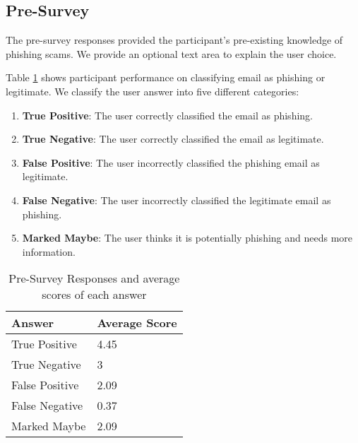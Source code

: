 \subsection{Pre-Survey}
The pre-survey responses provided the participant's pre-existing knowledge of phishing scams. We provide an optional text area to explain the user choice.

Table \ref{tab:pre_survey_responses} shows participant performance on classifying email as phishing or legitimate. We classify the user answer into five different categories:

\begin{enumerate}
    \setlength{\itemsep}{0pt}
    \setlength{\parskip}{0pt}
    \setlength{\topsep}{0pt}
    \item \textbf{True Positive}: The user correctly classified the email as phishing.
    \item \textbf{True Negative}: The user correctly classified the email as legitimate.
    \item \textbf{False Positive}: The user incorrectly classified the phishing email as legitimate.
    \item \textbf{False Negative}: The user incorrectly classified the legitimate email as phishing.
    \item \textbf{Marked Maybe}: The user thinks it is potentially phishing and needs more information.
\end{enumerate}

\begin{table}[!ht]
    \centering
    \begin{tabular}{l l}
        \hline
        \textbf{Answer} & \textbf{Average Score} \\
        \hline
        True Positive   & 4.45                   \\
        True Negative   & 3                      \\
        False Positive  & 2.09                   \\
        False Negative  & 0.37                   \\
        Marked Maybe    & 2.09                   \\
    \end{tabular}
    \caption{Pre-Survey Responses and average scores of each answer}
    \label{tab:pre_survey_responses}
\end{table}


